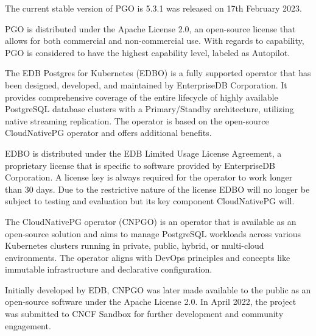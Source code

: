 The current stable version of PGO is 5.3.1 was released on 17th February 2023. \cite{CrunchyV531releaseNotes}

PGO is distributed under the Apache License 2.0, an open-source license that allows for both commercial and non-commercial use. With regards to capability, PGO is considered to have the highest capability level, labeled as Autopilot. \cite{operatorHubCrunchy}

The EDB Postgres for Kubernetes (EDBO) is a fully supported operator that has been designed, developed, and maintained by EnterpriseDB Corporation. It provides comprehensive coverage of the entire lifecycle of highly available PostgreSQL database clusters with a Primary/Standby architecture, utilizing native streaming replication. The operator is based on the open-source CloudNativePG operator and offers additional benefits. \cite{operatorHubEDB}

EDBO is distributed under the EDB Limited Usage License Agreement, a proprietary license that is specific to software provided by EnterpriseDB Corporation. A license key is always required for the operator to work longer than 30 days. \cite{EDBdocuLicence} Due to the restrictive nature of the license EDBO will no longer be subject to testing and evaluation but its key component CloudNativePG will.

The CloudNativePG operator (CNPGO) is an operator that is available as an open-source solution and aims to manage PostgreSQL workloads across various Kubernetes clusters running in private, public, hybrid, or multi-cloud environments. The operator aligns with DevOps principles and concepts like immutable infrastructure and declarative configuration. \cite{CNPGdocu}

Initially developed by EDB, CNPGO was later made available to the public as an open-source software under the Apache License 2.0. In April 2022, the project was submitted to CNCF Sandbox for further development and community engagement. \cite{CNPGdocu}

